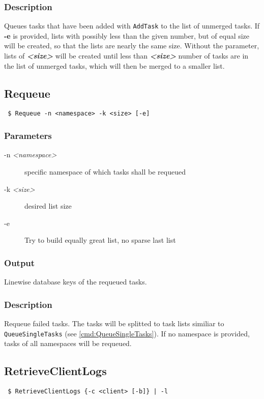\documentclass[a4paper,11pt]{article}
\begin{document}
\subsubsection{Description}
Queues tasks that have been added with \texttt{AddTask} to the list of unmerged tasks. If \textbf{-e} is provided, lists with possibly less than the given number, but of equal size will be created, so that the lists are nearly the same size. Without the parameter, lists of \textbf{\textit{<size>}} will be created until less than \textbf{\textit{<size>}} number of tasks are in the list of unmerged tasks, which will then be merged to a smaller list.


\newpage


\subsection{Requeue\label{cmd:Requeue}}
\begin{verbatim}
 $ Requeue -n <namespace> -k <size> [-e]
\end{verbatim}

\subsubsection{Parameters}
\begin{description}
\item[-n \textit{<namespace>}] specific namespace of which tasks shall be requeued
\item[-k \textit{<size>}] desired list size
\item[-e] Try to build equally great list, no sparse last list
\end{description}

\subsubsection{Output}
Linewise database keys of the requeued tasks.

\subsubsection{Description}
Requeue failed tasks. The tasks will be splitted to task lists similiar to \texttt{QueueSingleTasks} (see \ref{cmd:QueueSingleTasks}). If no namespace is provided, tasks of all namespaces will be requeued.

\newpage

\subsection{RetrieveClientLogs\label{cmd:RetrieveClientLogs}}
\begin{verbatim}
 $ RetrieveClientLogs {-c <client> [-b]} | -l 
\end{verbatim}
\end{document}
